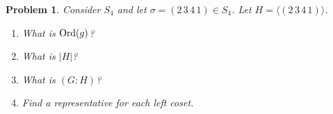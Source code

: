 \documentclass[reqno]{amsart}
\theoremstyle{plain}
\newtheorem{problem}{Problem}
\theoremstyle{definition}
\begin{document}
\begin{problem}
Consider $S_{4}$ and let $\sigma = (2 \, 3 \, 4 \, 1) \in S_{4}$.  Let $H = \langle (2 \, 3 \, 4 \, 1) \rangle $.
\begin{enumerate}
\item What is ${\rm Ord}(g)$?
\item What is $|H|$?
\item What is $(G:H)$?
\item Find a representative for each left coset.
\end{enumerate}
\end{problem}
\end{document}

